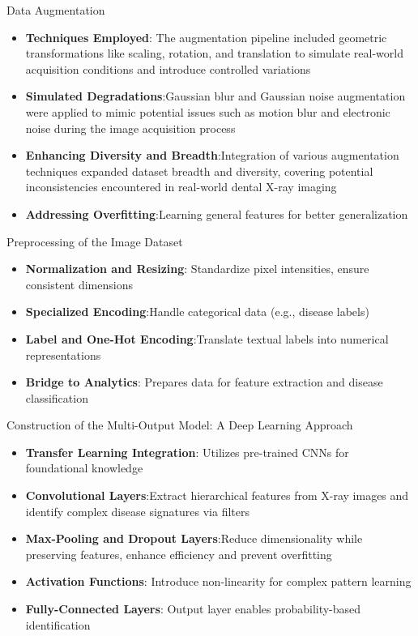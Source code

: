 \documentclass{beamer}
\begin{document}
\begin{frame}{Data Augmentation}
  \begin{itemize}
	\vfill
	\item \textbf{Techniques Employed}: The augmentation pipeline included geometric transformations like scaling, rotation, and translation to simulate real-world acquisition conditions and introduce controlled variations
	\vfill
	\item \textbf{Simulated Degradations}:Gaussian blur and Gaussian noise augmentation were applied to mimic potential issues such as motion blur and electronic noise during the image acquisition process
	\vfill
	\item \textbf{Enhancing Diversity and Breadth}:Integration of various augmentation techniques expanded dataset breadth and diversity, covering potential inconsistencies encountered in real-world dental X-ray imaging
	\vfill
	\item \textbf{Addressing Overfitting}:Learning general features for better generalization
	\end{itemize}
\end{frame}

\begin{frame}{Preprocessing of the Image Dataset}
	\begin{itemize}
		\vfill
		\item \textbf{Normalization and Resizing}: Standardize pixel intensities, ensure consistent dimensions
		\vfill
		\item \textbf{Specialized Encoding}:Handle categorical data (e.g., disease labels)
		\vfill
		\item \textbf{Label and One-Hot Encoding}:Translate textual labels into numerical representations
		\vfill
		\item \textbf{Bridge to Analytics}: Prepares data for feature extraction and disease classification
	\end{itemize}
\end{frame}

\begin{frame}{Construction of the Multi-Output Model: A Deep Learning Approach}
	\begin{itemize}
		\vfill
		\item \textbf{Transfer Learning Integration}: Utilizes pre-trained CNNs for foundational knowledge
		\vfill
		\item \textbf{Convolutional Layers}:Extract hierarchical features from X-ray images and identify complex disease signatures via filters
		\vfill
		\item \textbf{Max-Pooling and Dropout Layers}:Reduce dimensionality while preserving features, enhance efficiency and prevent overfitting
		\vfill
		\item \textbf{Activation Functions}: Introduce non-linearity for complex pattern learning
		\vfill
		\item \textbf{Fully-Connected Layers}: Output layer enables probability-based identification
	\end{itemize}
\end{frame}
\end{document}
